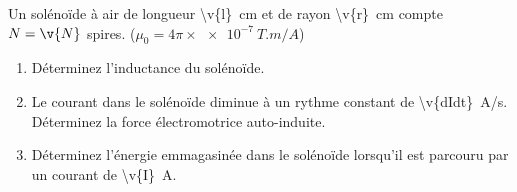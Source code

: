 Un solénoïde à air de longueur \qty{\v{l}}{cm} et de rayon \qty{\v{r}}{cm} compte $N = \v{N}$ spires. ($\mu_0 = 4\pi \times \qty{e-7}{T.m/A}$)

\begin{enumerate}[label=\alph*)]
    \item Déterminez l'inductance du solénoïde.
    \item Le courant dans le solénoïde diminue à un rythme constant de \qty{\v{dIdt}}{A/s}. Déterminez la force électromotrice auto-induite.
    \item Déterminez l'énergie emmagasinée dans le solénoïde lorsqu'il est parcouru par un courant de \qty{\v{I}}{A}.
\end{enumerate}
